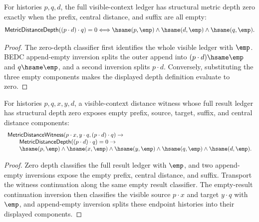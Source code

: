 \begin{theorem}
\label{thm:metric-distance-depth-visible-context-zero-iff}
For histories $p,q,d$, the full visible-context ledger has structural metric
depth zero exactly when the prefix, central distance, and suffix are all empty:
$$
\mathsf{MetricDistanceDepth}((p\cdot d)\cdot q)=0
\Longleftrightarrow
\hsame(p,\emp)\land\hsame(d,\emp)\land\hsame(q,\emp).
$$
\end{theorem}
\begin{proof}
The zero-depth classifier first identifies the whole visible ledger with
$\emp$. BEDC append-empty inversion splits the outer append into
$(p\cdot d)\hsame\emp$ and $q\hsame\emp$, and a second inversion splits
$p\cdot d$. Conversely, substituting the three empty components makes the
displayed depth definition evaluate to zero.
\end{proof}

\begin{theorem}
\label{thm:metric-distance-witness-visible-context-total-zero-components}
For histories $p,q,x,y,d$, a visible-context distance witness whose full result
ledger has structural depth zero exposes empty prefix, source, target, suffix,
and central distance components:
$$
\begin{array}{l}
\mathsf{MetricDistanceWitness}(p\cdot x,y\cdot q,(p\cdot d)\cdot q)\to\\
\qquad
\mathsf{MetricDistanceDepth}((p\cdot d)\cdot q)=0\to\\
\qquad
\hsame(p,\emp)\land\hsame(x,\emp)\land\hsame(y,\emp)\land
\hsame(q,\emp)\land\hsame(d,\emp).
\end{array}
$$
\end{theorem}
\begin{proof}
Zero depth classifies the full result ledger with $\emp$, and two
append-empty inversions expose the empty prefix, central distance, and suffix.
Transport the witness continuation along the same empty result classifier.
The empty-result continuation inversion then classifies the visible source
$p\cdot x$ and target $y\cdot q$ with $\emp$, and append-empty inversion splits
these endpoint histories into their displayed components.
\end{proof}

